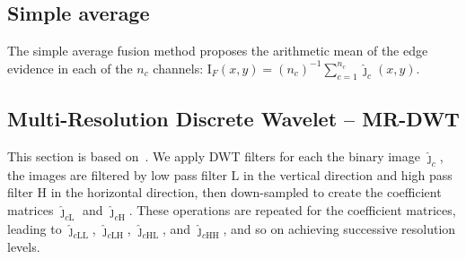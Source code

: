\documentclass[journal]{IEEEtran}
\begin{document}

\subsection{Simple average}
The simple average fusion method proposes the arithmetic mean of the edge evidence in each of the $n_c$ channels:
$\text{I}_F(x,y)=(n_c)^{-1}\sum_{c=1}^{n_c} \widehat{\bm\jmath}_c(x,y)$.

\subsection{Multi-Resolution Discrete Wavelet -- MR-DWT} 
This section is based on~\cite{n_r}.
We apply DWT filters for each the binary image $\bm{\widehat\jmath}_c$, the images are filtered by low pass filter $\text{L}$ in the vertical direction and high pass filter $\text{H}$ in the horizontal direction, then down-sampled to create the coefficient matrices $\bm{\widehat\jmath}_{c\text{L}}$ and $\bm{\widehat\jmath}_{c\text{H}}$.
These operations are repeated for the coefficient matrices, leading to $\bm{\widehat\jmath}_{c\text{LL}}$, $\bm{\widehat\jmath}_{c\text{LH}}$, $\bm{\widehat\jmath}_{c\text{HL}}$, and $\bm{\widehat\jmath}_{c\text{HH}}$, and so on achieving successive resolution levels.
\end{document}

